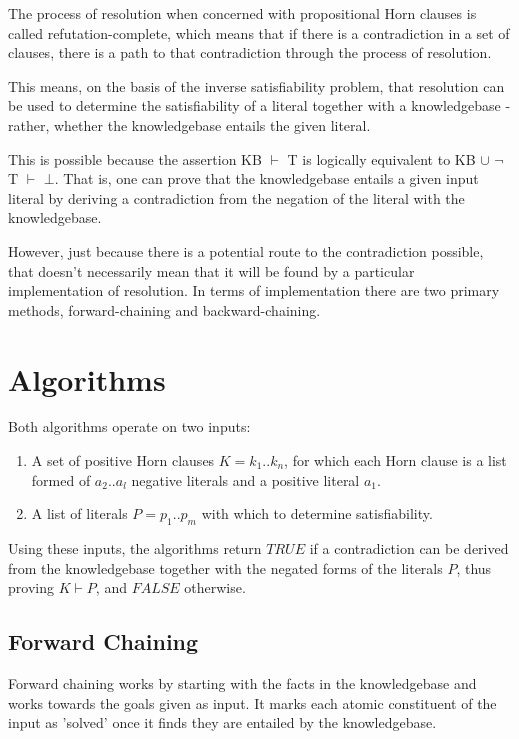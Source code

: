 \documentclass{article}
\begin{document}
The process of resolution when concerned with propositional Horn clauses is
called refutation-complete\cite{refcomp}, which means that if there is a
contradiction in a set of clauses, there is a path to that contradiction through
the process of resolution.\cite{resolution}

This means, on the basis of the inverse satisfiability problem\cite{invsat},
that resolution can be used to determine the satisfiability of a
literal together with a knowledgebase - rather, whether the knowledgebase entails the
given literal.

This is possible because the assertion KB $\vdash$ T is logically equivalent to
KB $\cup$ $\neg$T $\vdash$ $\bot$. That is, one can prove that the knowledgebase
entails a given input literal by deriving a contradiction from the negation of
the literal with the knowledgebase.

However, just because there is a potential route to the contradiction possible,
that doesn't necessarily mean that it will be found by a particular implementation of
resolution. In terms of implementation there are two primary methods, 
forward-chaining and backward-chaining.

\section{Algorithms}

Both algorithms operate on two inputs:

\begin{enumerate}
  \item A set of positive Horn clauses $K = k_1 .. k_n$, for which each Horn
  clause is a list formed of $a_2 .. a_l$ negative literals and a positive 
  literal $a_1$. 
  \item A list of literals $P = p_1 .. p_m$ with which to determine
  satisfiability.
\end{enumerate}

Using these inputs, the algorithms return $TRUE$ if a contradiction can be derived
from the knowledgebase together with the negated forms of the literals $P$, thus proving
$K \vdash P$, and $FALSE$ otherwise.

\subsection{Forward Chaining}

Forward chaining works by starting with the facts in the knowledgebase
and works towards the goals given as input. It marks each atomic constituent of
the input as 'solved' once it finds they are entailed by the knowledgebase.
\end{document}
